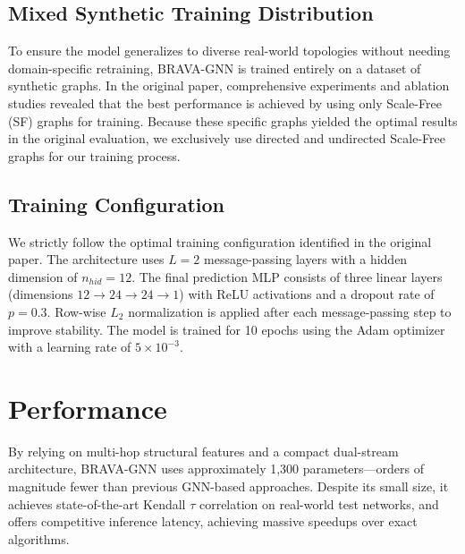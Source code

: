 \subsection{Mixed Synthetic Training Distribution}
To ensure the model generalizes to diverse real-world topologies without needing domain-specific retraining, BRAVA-GNN is trained entirely on a dataset of synthetic graphs. In the original paper, comprehensive experiments and ablation studies revealed that the best performance is achieved by using only Scale-Free (SF) graphs for training. Because these specific graphs yielded the optimal results in the original evaluation, we exclusively use directed and undirected Scale-Free graphs for our training process.

\subsection{Training Configuration}
We strictly follow the optimal training configuration identified in the original paper. The architecture uses $L=2$ message-passing layers with a hidden dimension of $n_{hid} = 12$. The final prediction MLP consists of three linear layers (dimensions $12 \to 24 \to 24 \to 1$) with ReLU activations and a dropout rate of $p=0.3$. Row-wise $L_2$ normalization is applied after each message-passing step to improve stability. The model is trained for 10 epochs using the Adam optimizer with a learning rate of $5 \times 10^{-3}$.

\section{Performance}

By relying on multi-hop structural features and a compact dual-stream architecture, BRAVA-GNN uses approximately 1,300 parameters—orders of magnitude fewer than previous GNN-based approaches. Despite its small size, it achieves state-of-the-art Kendall $\tau$ correlation on real-world test networks, and offers competitive inference latency, achieving massive speedups over exact algorithms.
